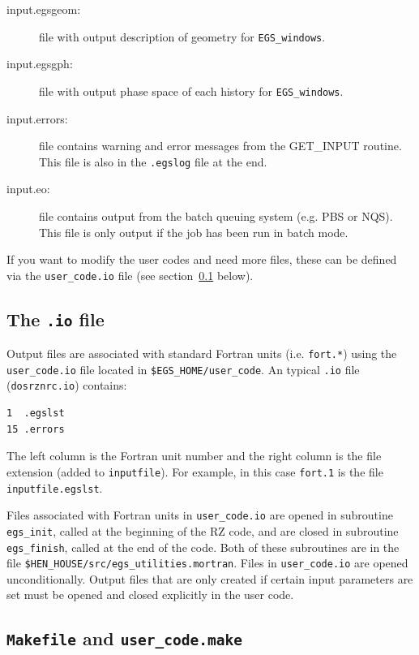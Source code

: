 \documentclass[12pt,twoside]{article}  %
\begin{document}
\begin{description}
\item [input.egsgeom:] file with output description of geometry for
\verb+EGS_windows+.

\item [input.egsgph:] file with output phase space of each history for
\verb+EGS_windows+.

\item[input.errors:] file contains warning and error messages from the
GET\_INPUT routine. This file is also in the {\tt .egslog} file at the end.

\item[input.eo:] file contains output from the batch queuing system
(e.g. PBS or NQS).  This file is only output if the job has been run
in batch mode.
\end{description}

If you want to modify the user codes and need more files, these can be
defined via the {\tt user\_code.io} file (see section~\ref{iofilesect}
below).

\subsection{The {\tt .io} file}
\label{iofilesect}

Output files are associated with standard Fortran units (i.e. {\tt fort.*})
using the {\tt user\_code.io} file located in
{\tt \$EGS\_HOME/user\_code}.  An typical {\tt .io} file
({\tt dosrznrc.io}) contains:
\begin{verbatim}
1  .egslst
15 .errors
\end{verbatim}
The left column is the Fortran unit number and the right column is the
file extension (added to {\tt inputfile}).  For example, in this case
{\tt fort.1} is the file {\tt inputfile.egslst}.

Files associated with Fortran units in {\tt user\_code.io} are opened
in subroutine {\tt egs\_init}, called at the
beginning of the RZ code, and are closed in subroutine
{\tt egs\_finish}, called at the end of the code.  Both of these subroutines
are in the file {\tt \$HEN\_HOUSE/src/egs\_utilities.mortran}.  Files
in {\tt user\_code.io} are opened unconditionally.
Output files that are only created if certain input parameters are set must
be opened and closed explicitly in the user code.

\subsection{{\tt Makefile} and {\tt user\_code.make}}
\label{makefilesect}
\end{document}

